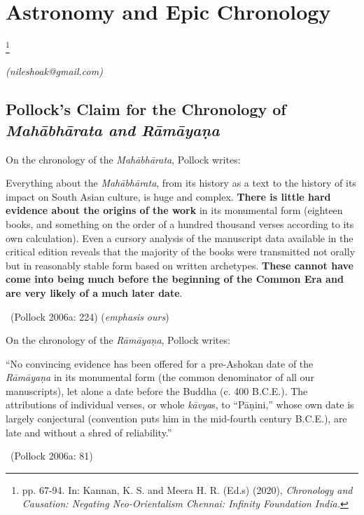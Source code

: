 
\chapter{Astronomy and Epic Chronology}\label{chapter2}

\footnote{pp. 67-94. In: Kannan, K. S. and Meera H. R. (Ed.s) (2020), \textit{Chronology and Causation: Negating Neo-Orientalism Chennai: Infinity Foundation India.}}

\begin{flushright}
\textit{(nileshoak@gmail.com)}
\end{flushright}


\section*{Pollock’s Claim for the Chronology \hfill\break of \textit{Mahābhārata and Rāmāyaṇa} }

On the chronology of the \textit{Mahābhārata}, Pollock writes:

\begin{myquote}
Everything about the \textit{Mahābhārata}, from its history as a text to the history of its impact on South Asian culture, is huge and complex. \textbf{There is little hard evidence about the origins of the work} in its monumental form (eighteen books, and something on the order of a hundred thousand verses according to its own calculation). Even a cursory analysis of the manuscript data available in the critical edition reveals that the majority of the books were transmitted not orally but in reasonably stable form based on written archetypes.\textbf{ These cannot have come into being much before the beginning of the Common Era and are very likely of a much later date}. 

~\hfill (Pollock 2006a: 224) (\textit{emphasis ours})
\end{myquote}

On the chronology of the \textit{Rāmāyaṇa}, Pollock writes:

\begin{myquote}
“No convincing evidence has been offered for a pre-Ashokan date of the \textit{Rāmāyaṇa} in its monumental form (the common denominator of all our manuscripts), let alone a date before the Buddha (c. 400 B.C.E.). The attributions of individual verses, or whole \textit{kāvya}s, to “Pāṇini,” whose own date is largely conjectural (convention puts him in the mid-fourth century B.C.E.), are late and without a shred of reliability.” 

~\hfill (Pollock 2006a: 81)
\end{myquote}

